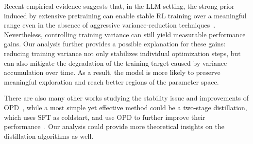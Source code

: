 Recent empirical evidence suggests that, in the LLM setting, the strong prior induced by extensive pretraining can enable stable RL training over a meaningful range even in the absence of aggressive variance-reduction techniques~\citep{ahmadian_back_2024}. Nevertheless, controlling training variance can still yield measurable performance gains. Our analysis further provides a possible explanation for these gains: reducing training variance not only stabilizes individual optimization steps, but can also mitigate the degradation of the training target caused by variance accumulation over time. As a result, the model is more likely to preserve meaningful exploration and reach better regions of the parameter space.

There are also many other works studying the stability issue and improvements of OPD~\citep{li_rethinking_2026, oh_kl_2026}, while a most simple yet effective method could be a two-stage distillation, which uses SFT as coldstart, and use OPD to further improve their performance~\citep{yang_qwen3_2025}. Our analysis could provide more theoretical insights on the distillation algorithms as well.
